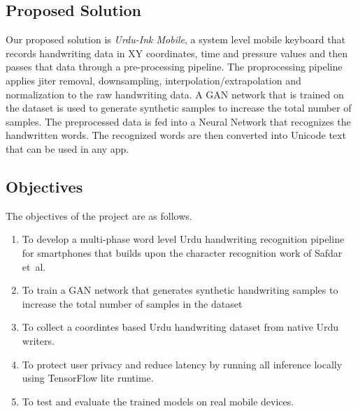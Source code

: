 \documentclass[12pt,a4paper]{report}
\begin{document}
\subsection{Proposed Solution}
Our proposed solution is \emph{Urdu-Ink Mobile}, a system level mobile keyboard that records handwriting data in XY coordinates, time and pressure values and then passes that data through a pre-processing pipeline. The proprocessing pipeline applies jiter removal, downsampling, interpolation/extrapolation and normalization to the raw handwriting data. A GAN network that is trained on the dataset is used to generate synthetic samples to increase the total number of samples.
The preprocessed data is fed into a Neural Network that recognizes the handwritten words. The recognized words are then converted into Unicode text that can be used in any app.

\subsection{Objectives}
The objectives of the project are as follows.
\begin{enumerate}[leftmargin=0.5in,itemsep=2pt]
\item To develop a multi-phase word level Urdu handwriting recognition pipeline for smartphones that builds upon the character recognition work of Safdar et~al.\ \cite{safdar2022}
\item To train a GAN network that generates synthetic handwriting samples to increase the total number of samples in the dataset
\item To collect a coordintes based Urdu handwriting dataset from native Urdu writers.
\item To protect user privacy and reduce latency by running all inference locally using TensorFlow lite runtime.
\item To test and evaluate the trained models on real mobile devices.
%
\end{enumerate}
\end{document}
